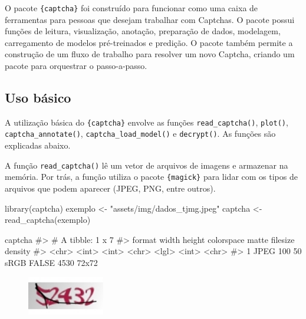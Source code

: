 \documentclass[12pt,twoside,brazilian]{book}
\newenvironment{Shaded}{\begin{snugshade}}{\end{snugshade}}
\newcommand{\CommentTok}[1]{\textcolor[rgb]{0.37,0.37,0.37}{#1}}
\newcommand{\FunctionTok}[1]{\textcolor[rgb]{0.28,0.35,0.67}{#1}}
\newcommand{\NormalTok}[1]{\textcolor[rgb]{0.00,0.23,0.31}{#1}}
\newcommand{\OtherTok}[1]{\textcolor[rgb]{0.00,0.23,0.31}{#1}}
\newcommand{\StringTok}[1]{\textcolor[rgb]{0.13,0.47,0.30}{#1}}
\begin{document}
O pacote \texttt{\{captcha\}} foi construído para funcionar como uma
caixa de ferramentas para pessoas que desejam trabalhar com Captchas. O
pacote possui funções de leitura, visualização, anotação, preparação de
dados, modelagem, carregamento de modelos pré-treinados e predição. O
pacote também permite a construção de um fluxo de trabalho para resolver
um novo Captcha, criando um pacote para orquestrar o passo-a-passo.

\hypertarget{uso-buxe1sico}{%
\subsection{Uso básico}\label{uso-buxe1sico}}

A utilização básica do \texttt{\{captcha\}} envolve as funções
\texttt{read\_captcha()}, \texttt{plot()}, \texttt{captcha\_annotate()},
\texttt{captcha\_load\_model()} e \texttt{decrypt()}. As funções são
explicadas abaixo.

A função \texttt{read\_captcha()} lê um vetor de arquivos de imagens e
armazenar na memória. Por trás, a função utiliza o pacote
\texttt{\{magick\}} para lidar com os tipos de arquivos que podem
aparecer (JPEG, PNG, entre outros).

\begin{Shaded}
\begin{Highlighting}[]
\FunctionTok{library}\NormalTok{(captcha)}
\NormalTok{exemplo }\OtherTok{\textless{}{-}} \StringTok{"assets/img/dados\_tjmg.jpeg"}
\NormalTok{captcha }\OtherTok{\textless{}{-}} \FunctionTok{read\_captcha}\NormalTok{(exemplo)}

\NormalTok{captcha}
\CommentTok{\#\textgreater{} \# A tibble: 1 x 7}
\CommentTok{\#\textgreater{}   format width height colorspace matte filesize density}
\CommentTok{\#\textgreater{}   \textless{}chr\textgreater{}  \textless{}int\textgreater{}  \textless{}int\textgreater{} \textless{}chr\textgreater{}      \textless{}lgl\textgreater{}    \textless{}int\textgreater{} \textless{}chr\textgreater{}  }
\CommentTok{\#\textgreater{} 1 JPEG     100     50 sRGB       FALSE     4530 72x72}
\end{Highlighting}
\end{Shaded}

\begin{figure}[H]

{\centering \includegraphics[width=0.3\textwidth,height=\textheight]{./resultados_files/figure-pdf/unnamed-chunk-11-1.png}

}

\end{figure}
\end{document}
